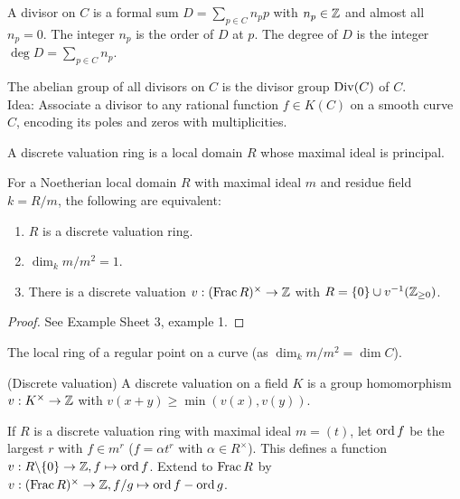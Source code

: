 \documentclass[a4paper,11pt]{article}
\begin{document}
			\begin{defi}
				A divisor on $C$ is a formal sum $D=\sum_{p\in C}n_pp$ with $n_p\in\mathbb{Z}$ and almost all $n_p=0$. The integer $n_p$ is the order of $D$ at $p$. The degree of $D$ is the integer $\deg D=\sum_{p\in C}n_p$. 
			\end{defi}

			The abelian group of all divisors on $C$ is the divisor group $\operatorname{Div}(C)$ of $C$.
			\\

			\noindent Idea: Associate a divisor to any rational function $f\in K(C)$ on a smooth curve $C$, encoding its poles and zeros with multiplicities. 

			\begin{defi}
				A discrete valuation ring is a local domain $R$ whose maximal ideal is principal.
			\end{defi}

			\begin{prop}
				For a Noetherian local domain $R$ with maximal ideal $m$ and residue field $k=R/m$, the following are equivalent:
				\begin{enumerate}
					\item $R$ is a discrete valuation ring.
					\item $\dim_km/m^2=1$.
					\item There is a discrete valuation $v:(\operatorname{Frac} R)^\times\rightarrow\mathbb{Z}$ with $R=\{0\}\cup v^{-1}(\mathbb{Z}_{\ge0})$.
				\end{enumerate}
			\end{prop}
			\begin{proof}
				See Example Sheet 3, example 1.
			\end{proof}

			\begin{eg}
				The local ring of a regular point on a curve (as $\dim_km/m^2=\dim C$).
			\end{eg}

			\begin{defi}(Discrete valuation)
				A discrete valuation on a field $K$ is a group homomorphism $v:K^\times\rightarrow\mathbb{Z}$ with $v(x+y)\ge\min(v(x),v(y))$.
			\end{defi}

			\begin{eg}
				If $R$ is a discrete valuation ring with maximal ideal $m=(t)$, let $\operatorname{ord} f$ be the largest $r$ with $f\in m^r$ ($f=\alpha t^r$ with $\alpha\in R^\times$). This defines a function $v:R\backslash\{0\}\rightarrow\mathbb{Z}, f\mapsto\operatorname{ord} f$.
				Extend to $\operatorname{Frac} R$ by $v:(\operatorname{Frac} R)^\times\rightarrow\mathbb{Z}, f/g\mapsto \operatorname{ord} f-\operatorname{ord} g$.
			\end{eg}
\end{document}
